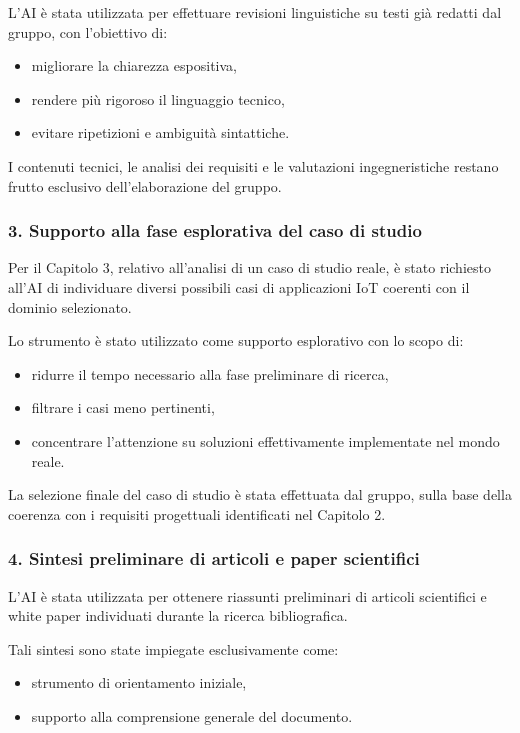 L'AI è stata utilizzata per effettuare revisioni linguistiche su testi già redatti dal gruppo, con l'obiettivo di:
\begin{itemize}
    \item migliorare la chiarezza espositiva,
    \item rendere più rigoroso il linguaggio tecnico,
    \item evitare ripetizioni e ambiguità sintattiche.
\end{itemize}

I contenuti tecnici, le analisi dei requisiti e le valutazioni ingegneristiche restano frutto esclusivo dell'elaborazione del gruppo.

\subsubsection*{3. Supporto alla fase esplorativa del caso di studio}

Per il Capitolo 3, relativo all'analisi di un caso di studio reale, è stato richiesto all'AI di individuare diversi possibili casi di applicazioni IoT coerenti con il dominio selezionato.

Lo strumento è stato utilizzato come supporto esplorativo con lo scopo di:
\begin{itemize}
    \item ridurre il tempo necessario alla fase preliminare di ricerca,
    \item filtrare i casi meno pertinenti,
    \item concentrare l'attenzione su soluzioni effettivamente implementate nel mondo reale.
\end{itemize}

La selezione finale del caso di studio è stata effettuata dal gruppo, sulla base della coerenza con i requisiti progettuali identificati nel Capitolo 2.

\subsubsection*{4. Sintesi preliminare di articoli e paper scientifici}

L'AI è stata utilizzata per ottenere riassunti preliminari di articoli scientifici e white paper individuati durante la ricerca bibliografica.

Tali sintesi sono state impiegate esclusivamente come:
\begin{itemize}
    \item strumento di orientamento iniziale,
    \item supporto alla comprensione generale del documento.
\end{itemize}

